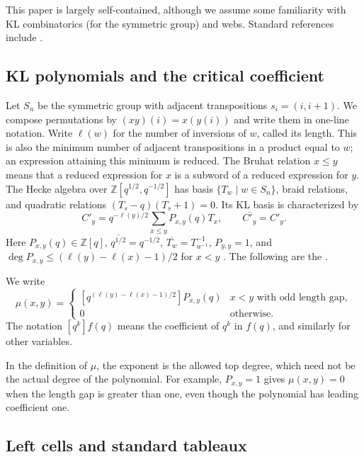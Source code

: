 \documentclass[a4paper,11pt]{amsart}
\let\emph\relax
\newcommand{\qpar}{q}
\numberwithin{equation}{subsection}
\theoremstyle{plain}
\theoremstyle{definition}
\theoremstyle{remark}
\begin{document}
This paper is largely self-contained, although we assume some familiarity with KL combinatorics (for the symmetric group) and webs. Standard references include \cite{BjornerBrenti,Kuperberg}.

\subsection{KL polynomials and the critical coefficient}

Let $S_n$ be the symmetric group with adjacent transpositions
$s_i=(i,i+1)$. We compose permutations by $(xy)(i)=x(y(i))$
and write them in one-line notation. 
Write $\ell(w)$ for the number of inversions of $w$, called its length.
This is also the minimum number of adjacent transpositions in a product equal to $w$;
an expression attaining this minimum is reduced.
The Bruhat relation $x\le y$ means that a reduced expression for $x$
is a subword of a reduced expression for $y$.
The Hecke algebra over $\mathbb Z[\qpar^{1/2},\qpar^{-1/2}]$ has basis
$\{T_w\mid w\in S_n\}$, braid relations, and quadratic relations
$(T_s-\qpar)(T_s+1)=0$. Its KL basis is characterized by
\[
C'_y=\qpar^{-\ell(y)/2}\sum_{x\le y}P_{x,y}(\qpar)T_x,
\qquad \overline{C'_y}=C'_y.
\]
Here $P_{x,y}(\qpar)\in\mathbb Z[\qpar]$, $\overline{\qpar^{1/2}}=\qpar^{-1/2}$,
$\overline{T_w}=T_{w^{-1}}^{-1}$, $P_{y,y}=1$, and
$\deg P_{x,y}\le(\ell(y)-\ell(x)-1)/2$ for $x<y$ \cite{KL}. The following 
are the \emph{$\mu$-coefficients}.

\begin{definition}
We write
\[
\mu(x,y)=
\begin{cases}
[\qpar^{(\ell(y)-\ell(x)-1)/2}]P_{x,y}(\qpar)&x<y\text{ with odd length gap},\\
0&\text{otherwise}.
\end{cases}
\]
The notation $[\qpar^k]f(\qpar)$ means the coefficient of $\qpar^k$ in $f(\qpar)$,
and similarly for other variables. 
\end{definition}

In the definition of $\mu$, the exponent is the allowed top degree,
which need not be the actual degree of the polynomial.
For example, $P_{x,y}=1$ gives $\mu(x,y)=0$ when the length gap is
greater than one, even though the polynomial has leading coefficient one.

\subsection{Left cells and standard tableaux}
\end{document}
